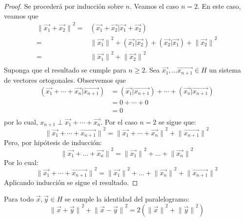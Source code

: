 \documentclass[12pt]{report}
\newcounter{it}
\theoremstyle{largebreak}
\newcommand\norm[1]{\ensuremath{\|#1\|}}
\newcommand\pint[2]{\ensuremath{\left(#1\big| #2\right)}}
\begin{document}
    \begin{proof}
        Se procederá por inducción sobre $n$. Veamos el caso $n=2$. En este caso, veamos que
        \begin{equation*}
            \begin{split}
                \norm{\vec{x_1}+\vec{x_2}}^2=&\pint{\vec{x_1}+\vec{x_2}}{\vec{x_1}+\vec{x_2}}\\
                =&\norm{\vec{x_1}}^2+\pint{\vec{x_1}}{\vec{x_2}}+\pint{\vec{x_2}}{\vec{x_1}}+\norm{\vec{x_2}}^2\\
                =&\norm{\vec{x_1}}^2+\norm{\vec{x_2}}^2\\
            \end{split}
        \end{equation*}
        Suponga que el resultado se cumple para $n\geq2$. Sea $\vec{x_1},...\vec{x_{n+1}}\in H$ un sistema de vectores ortogonales. Observemos que
        \begin{equation*}
            \begin{split}
                \pint{\vec{x_1}+\cdots+\vec{x_n}}{\vec{x_{n+1}}}&=\pint{\vec{x_1}}{\vec{x_{n+1}}}+\cdots+\pint{\vec{x_n}}{\vec{x_{n+1}}}\\
                &=0+\cdots+0\\
                &=0\\
            \end{split}
        \end{equation*}
        por lo cual, $x_{n+1}\perp\vec{x_1}+\cdots+\vec{x_n}$. Por el caso $n=2$ se sigue que:
        \begin{equation*}
            \norm{\vec{x_1}+\cdots+\vec{x_{n+1}}}^2=\norm{\vec{x_1}+\cdots+\vec{x_n}}^2+\norm{\vec{x_{n+1}}}^2
        \end{equation*}
        Pero, por hipótesis de inducción:
        \begin{equation*}
            \norm{\vec{x_1}+\dots+\vec{x_n}}^2=\norm{\vec{x_1}}^2+\dots+\norm{\vec{x_n}}^2
        \end{equation*}
        Por lo cual:
        \begin{equation*}
            \norm{\vec{x_1}+\cdots+\vec{x_{n+1}}}^2=\norm{\vec{x_1}}^2+\dots+\norm{\vec{x_n}}^2+\norm{\vec{x_{n+1}}}^2
        \end{equation*}
        Aplicando inducción se sigue el resultado.
    \end{proof}

    \begin{propo}
        Para todo $\vec{x},\vec{y}\in H$ se cumple la identidad del paralelogramo:
        \begin{equation*}
            \norm{\vec{x}+\vec{y}}^2+\norm{\vec{x}-\vec{y}}^2=2(\norm{\vec{x}}^2+\norm{\vec{y}}^2)
        \end{equation*}
    \end{propo}
\end{document}
